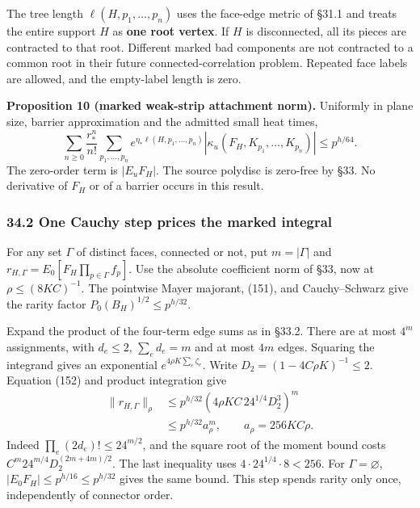 \documentclass[11pt,a4paper]{article}
\begin{document}
The tree length \(\ell(H,p_1,\ldots,p_n)\) uses the face-edge metric of
§31.1 and treats the entire support \(H\) as \textbf{one root vertex}.
If \(H\) is disconnected, all its pieces are contracted to that root.
Different marked bad components are not contracted to a common root in
their future connected-correlation problem. Repeated face labels are
allowed, and the empty-label length is zero.

\textbf{Proposition 10 (marked weak-strip attachment norm).} Uniformly
in plane size, barrier approximation and the admitted small heat times,
\[\sum_{n\ge0}\frac{r_*^n}{n!}\sum_{p_1,\ldots,p_n}
 e^{\eta_*\ell(H,p_1,\ldots,p_n)}
 |\kappa_u(F_H,K_{p_1},\ldots,K_{p_n})|
 \le p^{h/64}.\tag{157}\] The zero-order term is \(|E_uF_H|\). The
source polydisc is zero-free by §33. No derivative of \(F_H\) or of a
barrier occurs in this result.

\hypertarget{one-cauchy-step-prices-the-marked-integral}{%
\subsubsection{34.2 One Cauchy step prices the marked
integral}\label{one-cauchy-step-prices-the-marked-integral}}

For any set \(\Gamma\) of distinct faces, connected or not, put
\(m=|\Gamma|\) and \(r_{H,\Gamma}=E_0[F_H\prod_{p\in\Gamma}f_p]\). Use
the absolute coefficient norm of §33, now at \(\rho\le(8KC)^{-1}\). The
pointwise Mayer majorant, (151), and Cauchy--Schwarz give the rarity
factor \(P_0(B_H)^{1/2}\le p^{h/32}\).

Expand the product of the four-term edge sums as in §33.2. There are at
most \(4^m\) assignments, with \(d_e\le2\), \(\sum_ed_e=m\) and at most
\(4m\) edges. Squaring the integrand gives an exponential
\(e^{4\rho K\sum_e\zeta_e}\). Write \(D_2=(1-4C\rho K)^{-1}\le2\).
Equation (152) and product integration give \[\begin{aligned}
\|r_{H,\Gamma}\|_\rho
 &\le p^{h/32}
       (4\rho KC\,24^{1/4}D_2^3)^m\\
 &\le p^{h/32}a_\rho^m,\qquad a_\rho=256KC\rho.
\end{aligned}\tag{158}\] Indeed \(\prod_e(2d_e)!\le24^{m/2}\), and the
square root of the moment bound costs \(C^m24^{m/4}D_2^{(2m+4m)/2}\).
The last inequality uses \(4\cdot24^{1/4}\cdot8<256\). For
\(\Gamma=\varnothing\), \(|E_0F_H|\le p^{h/16}\le p^{h/32}\) gives the
same bound. This step spends rarity only once, independently of
connector order.
\end{document}
